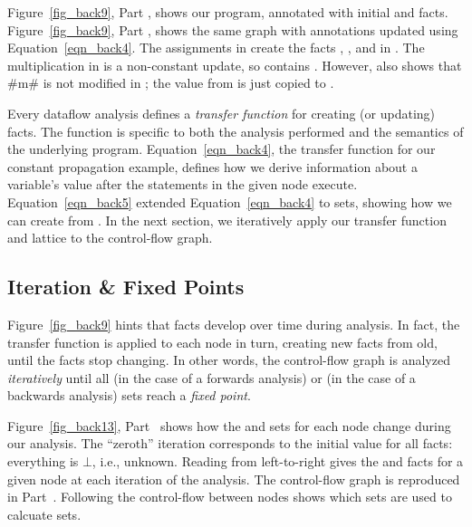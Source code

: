 \documentclass[12pt]{report}
\begin{document}
Figure~\ref{fig_back9}, Part , shows our
program, annotated with initial \inE and \out
facts. Figure~\ref{fig_back9}, Part , shows
the same graph with annotations updated using
Equation~\eqref{eqn_back4}. The assignments in
 create the facts ,
, and  in . The
multiplication in  is a non-constant update,
so  contains . However,
 also shows that #m# is not modified in
; the value from  is
just copied to .

\afterpage{\clearpage\clearpage}

Every dataflow analysis defines a \emph{transfer function} for
creating (or updating) facts. The function is specific to both the
analysis performed and the semantics of the underlying
program. Equation~\eqref{eqn_back4}, the transfer function for our
constant propagation example, defines how we derive information about
a variable's value after the statements in the given node execute.
Equation~\eqref{eqn_back5} extended Equation~\eqref{eqn_back4} to sets,
showing how we can create \outBa from \inBa. In the next section, we
iteratively apply our transfer function and lattice to the
control-flow graph. 

\subsection{Iteration \& Fixed Points}
\label{back_subsec_iter}

Figure~\ref{fig_back9} hints that facts
develop over time during analysis. In fact, the transfer function is
applied to each node in turn, creating new facts from old, until the
facts stop changing. In other words, the control-flow graph is
analyzed \emph{iteratively} until all \out (in the case of a forwards
analysis) or \inE (in the case of a backwards analysis) sets reach a
\emph{fixed point}.

Figure~\ref{fig_back13}, Part~ shows how the
\inE and \out sets for each node change during our
analysis. The ``zeroth'' iteration corresponds to the initial value
for all facts: everything is $\bot$, i.e., unknown. Reading from
left-to-right gives the \inE and \out facts for a given node at each
iteration of the analysis. The control-flow graph is reproduced in
Part~. Following the control-flow between nodes
shows which \out sets are used to calcuate \inE sets.
\end{document}
